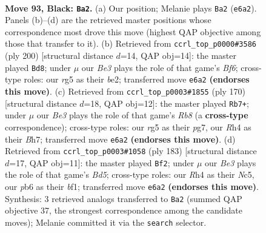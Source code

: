 \documentclass[11pt]{article}
\begin{document}
\clearpage

\begin{figure}[p]\centering
\begin{subfigure}{0.46\textwidth}\centering
\resizebox{\linewidth}{!}{%
\newchessgame
\chessboard[
  setfen={8/3k4/1P2bR2/6R1/7r/5K2/8/8 b - - 6 93},
  showmover=false,
  pgfstyle=straightmove, color=movearrow, markmove={e6-a2}
]}
\caption{}
\end{subfigure}\hfill
\begin{subfigure}{0.46\textwidth}\centering
\resizebox{\linewidth}{!}{%
\newchessgame
\chessboard[
  setfen={8/8/k1r2B2/4K3/7P/8/4b3/1R6 w - - 8 101},
  showmover=false,
  pgfstyle=straightmove, color=movearrow, markmove={f6-d8}
]}
\caption{}
\end{subfigure}
\\[4pt]
\begin{subfigure}{0.46\textwidth}\centering
\resizebox{\linewidth}{!}{%
\newchessgame
\chessboard[
  setfen={1R3r2/5kpB/8/8/4K3/8/8/8 w - - 75 86},
  showmover=false,
  pgfstyle=straightmove, color=movearrow, markmove={b8-b7}
]}
\caption{}
\end{subfigure}\hfill
\begin{subfigure}{0.46\textwidth}\centering
\resizebox{\linewidth}{!}{%
\newchessgame
\chessboard[
  setfen={8/8/8/2n2K2/3b3R/2k5/8/5B2 b - - 24 92},
  showmover=false,
  pgfstyle=straightmove, color=movearrow, markmove={d4-f2}
]}
\caption{}
\end{subfigure}
\caption{\textbf{Move 93, Black: \texttt{Ba2}.} (a) Our position; Melanie plays \texttt{Ba2} (\texttt{e6a2}). Panels (b)--(d) are the retrieved master positions whose correspondence most drove this move (highest QAP objective among those that transfer to it). (b) Retrieved from \texttt{ccrl\_top\_p0000\#3586} (ply 200) [structural distance $d$=14, QAP obj=14]: the master played \texttt{Bd8}; under $\mu$ our \emph{Be3} plays the role of that game's \emph{Bf6}; cross-type roles: our \emph{r}g5 as their \emph{b}e2; transferred move \texttt{e6a2} \textbf{(endorses this move)}. (c) Retrieved from \texttt{ccrl\_top\_p0003\#1855} (ply 170) [structural distance $d$=18, QAP obj=12]: the master played \texttt{Rb7+}; under $\mu$ our \emph{Be3} plays the role of that game's \emph{Rb8} (a \textbf{cross-type} correspondence); cross-type roles: our \emph{r}g5 as their \emph{p}g7, our \emph{R}h4 as their \emph{B}h7; transferred move \texttt{e6a2} \textbf{(endorses this move)}. (d) Retrieved from \texttt{ccrl\_top\_p0003\#1058} (ply 183) [structural distance $d$=17, QAP obj=11]: the master played \texttt{Bf2}; under $\mu$ our \emph{Be3} plays the role of that game's \emph{Bd5}; cross-type roles: our \emph{R}h4 as their \emph{N}c5, our \emph{p}b6 as their \emph{b}f1; transferred move \texttt{e6a2} \textbf{(endorses this move)}. Synthesis: 3 retrieved analogs transferred to \texttt{Ba2} (summed QAP objective 37, the strongest correspondence among the candidate moves); Melanie committed it via the \texttt{search} selector.}
\label{fig:thought-m185}
\end{figure}
\end{document}
